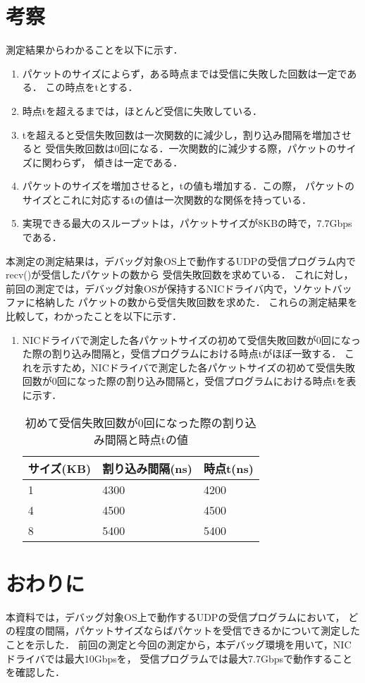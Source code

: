 \documentclass[12pt]{jsarticle}
\begin{document}
\section{考察}
測定結果からわかることを以下に示す．
\begin{enumerate}
    \item パケットのサイズによらず，ある時点までは受信に失敗した回数は一定である．
        この時点をtとする．
    \item 時点tを超えるまでは，ほとんど受信に失敗している．
    \item tを超えると受信失敗回数は一次関数的に減少し，割り込み間隔を増加させると
        受信失敗回数は0回になる．一次関数的に減少する際，パケットのサイズに関わらず，
        傾きは一定である．
    \item パケットのサイズを増加させると，tの値も増加する．この際，
        パケットのサイズとこれに対応するtの値は一次関数的な関係を持っている．
    \item 実現できる最大のスループットは，パケットサイズが8KBの時で，7.7Gbpsである．
\end{enumerate}
本測定の測定結果は，デバッグ対象OS上で動作するUDPの受信プログラム内でrecv()が受信したパケットの数から
受信失敗回数を求めている．
これに対し，前回の測定では，デバッグ対象OSが保持するNICドライバ内で，ソケットバッファに格納した
パケットの数から受信失敗回数を求めた．
これらの測定結果を比較して，わかったことを以下に示す．
\begin{enumerate}
    \item NICドライバで測定した各パケットサイズの初めて受信失敗回数が0回になった際の割り込み間隔と，受信プログラムにおける時点tがほぼ一致する．
        これを示すため，NICドライバで測定した各パケットサイズの初めて受信失敗回数が0回になった際の割り込み間隔と，受信プログラムにおける時点tを表に示す．
        \begin{table}[htbp]
            \caption{初めて受信失敗回数が0回になった際の割り込み間隔と時点tの値}
            \label{jiten}
            \begin{center}
                \begin{tabular}{l|l|l}   \hline \hline 
                    サイズ(KB)  & 割り込み間隔(ns)  & 時点t(ns)  \\ \hline
                    1           & 4300              & 4200   \\ 
                    4           & 4500              & 4500   \\ 
                    8           & 5400              & 5400   \\ \hline
                \end{tabular}
            \end{center}
        \end{table}
\end{enumerate}

\section{おわりに}
本資料では，デバッグ対象OS上で動作するUDPの受信プログラムにおいて，
どの程度の間隔，パケットサイズならばパケットを受信できるかについて測定したことを示した．
前回の測定と今回の測定から，本デバッグ環境を用いて，NICドライバでは最大10Gbpsを，
受信プログラムでは最大7.7Gbpsで動作することを確認した．
\end{document}
